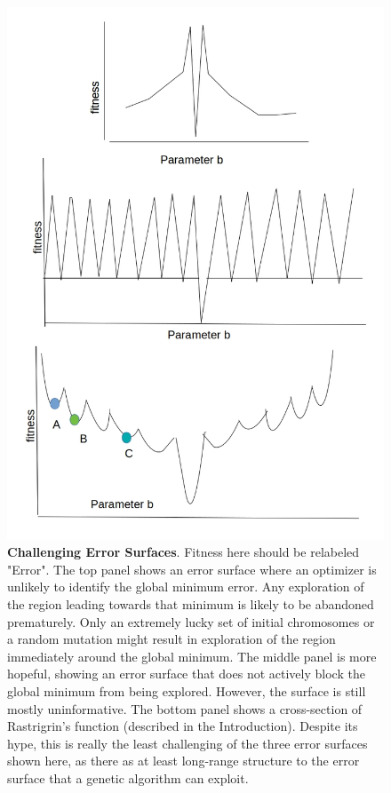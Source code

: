 \begin{figure}
\centering
      \label{fig:test1}
      \centering
      \includegraphics[scale=0.75]{figures/spectrum_worst_error_surfaces2.jpg}
      \caption[Challenging Error Surfaces]{\textbf{Challenging Error Surfaces}. 
      Fitness here should be relabeled "Error".
      The top panel shows an error surface where an optimizer is unlikely to identify the global minimum error.
      Any exploration of the region leading towards that minimum is likely to be abandoned prematurely.
      Only an extremely lucky set of initial chromosomes or a random mutation might result in exploration of the region immediately around the global minimum.
      The middle panel is more hopeful, showing an error surface that does not actively block the global minimum from being explored.
      However, the surface is still mostly uninformative.
      The bottom panel shows a cross-section of Rastrigrin's function (described in the Introduction).
      Despite its hype, this is really the least challenging of the three error surfaces shown here, as there as at least long-range structure to the error surface that a genetic algorithm can exploit.
      }
      \label{fig:test2}
\end{figure} 

